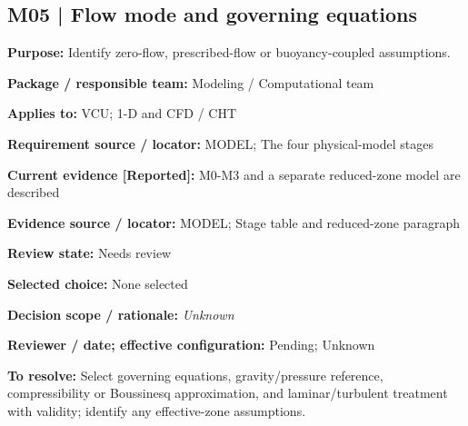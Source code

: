 \documentclass[11pt]{article}
\begin{document}
\par\noindent\begin{minipage}{\textwidth}\small\setlength{\parskip}{2pt}
\subsection*{M05 | Flow mode and governing equations}
\textbf{Purpose:} Identify zero-flow, prescribed-flow or buoyancy-coupled assumptions.\par
\textbf{Package / responsible team:} Modeling / Computational team\par
\textbf{Applies to:} VCU; 1-D and CFD / CHT\par
\textbf{Requirement source / locator:} MODEL; The four physical-model stages\par
\textbf{Current evidence [Reported]:} M0-M3 and a separate reduced-zone model are described\par
\textbf{Evidence source / locator:} MODEL; Stage table and reduced-zone paragraph\par
\textbf{Review state:} Needs review\par
\textbf{Selected choice:} None selected\par
\textbf{Decision scope / rationale:} \textit{Unknown}\par
\textbf{Reviewer / date; effective configuration:} Pending; Unknown\par
\textbf{To resolve:} Select governing equations, gravity/pressure reference, compressibility or Boussinesq approximation, and laminar/turbulent treatment with validity; identify any effective-zone assumptions.\par
\end{minipage}\par\vspace{5pt}
\end{document}

